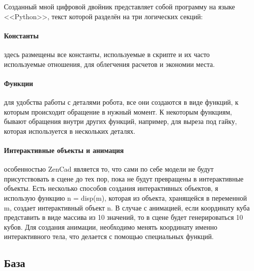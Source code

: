 Созданный мной цифровой двойник представляет собой программу на языке <<Python>>, текст которой разделён на три логических секций:

\paragraph{Константы} здесь размещены все константы, используемые в скрипте и их часто используемые отношения, для облегчения расчетов и экономии места.
\paragraph{Функции} для удобства работы с деталями робота, все они создаются в виде функций, к которым происходит обращение в нужный момент. К некоторым функциям, бывают обращения внутри других функций, например, для выреза под гайку, которая используется в нескольких деталях.  
\paragraph{Интерактивные объекты и анимация} особенностью ZenCad является то, что сами по себе модели не будут присутствовать в сцене до тех пор, пока не будут превращены в интерактивные объекты. Есть несколько способов создания интерактивных объектов, я использую функцию n = disp(m), которая из объекта, хранящейся в переменной m, создает интерактивный объект n. В случае с анимацией, если координату куба представить в виде массива из 10 значений, то в сцене будет генерироваться 10 кубов. Для создания анимации, необходимо менять координату именно интерактивного тела, что делается с помощью специальных функций. 

\subsection{База}



